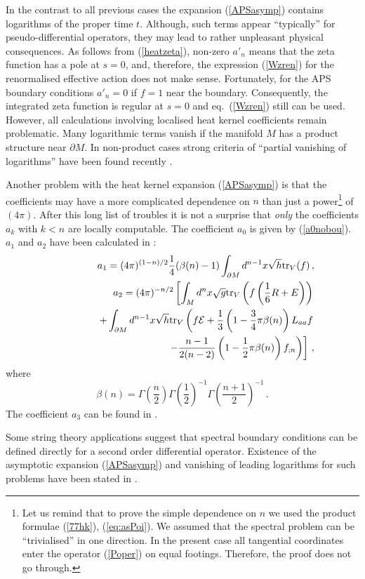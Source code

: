 In the contrast to all previous cases the expansion (\ref{APSasymp}) contains
logarithms of the proper time $t$. Although, such terms appear ``typically''
\cite{GG98} for pseudo-differential operators, they may lead to rather
unpleasant physical consequences. As follows from (\ref{heatzeta}),
non-zero $a'_n$ means that the zeta function has a pole at $s=0$, and,
therefore, the expression (\ref{Wzren}) for the renormalised
effective action does not make sense. Fortunately, for the APS
boundary conditions $a'_n=0$ if $f=1$ near the boundary. 
Consequently, the integrated
zeta function is regular at $s=0$ and eq.\ (\ref{Wzren}) still can be
used. However, all calculations involving localised heat kernel
coefficients remain problematic. Many logarithmic terms vanish if
the manifold $M$ has a product structure near $\partial M$.
In non-product cases strong criteria of ``partial vanishing of
logarithms'' have been found recently \cite{Grubb:2003ys}.

Another problem with the heat kernel expansion (\ref{APSasymp})
is that the coefficients may have a more complicated dependence
on $n$ than just a power\footnote{Let us remind that
to prove the simple dependence on $n$ we used the product
formulae (\ref{77hk}), (\ref{eq:asPoi}). We assumed that the
spectral problem can be ``trivialised'' in one direction.
In the present case all tangential coordinates enter the operator
(\ref{Poper}) on equal footings. Therefore, the proof does not go through.}
 of $(4\pi )$. After this long list of troubles it is not a surprise
that {\it only} the coefficients $a_k$ with $k<n$ are locally
computable.
The coefficient $a_0$ is given by (\ref{a0nobou}).
$a_1$ and  $a_2$ have been calculated in \cite{Dowker:2000sy}:
\begin{eqnarray}
&&a_1=(4\pi )^{(1-n)/2} \frac 14 (\beta (n)-1) \int_{\partial M} d^{n-1}x\sqrt{h} {\rm tr}_V (f)\,,
\nonumber\\
&&a_2=(4\pi )^{-n/2}\left[ \int_M d^nx\sqrt{g} {\rm tr}_V \left( f\left(\frac 16 R+E\right) \right)
\right.\nonumber\\
&&\qquad\qquad +\int_{\partial M} d^{n-1}x\sqrt{h} {\rm tr}_V \left( f \mathcal{E} +\frac 13 \left( 1-\frac 34 
\pi \beta (n) \right)L_{aa}f \right. \label{hkAPS} \\
&&\qquad\qquad \left.\left. -\frac{n-1}{2(n-2)} \left( 1-\frac 12 \pi
\beta (n)\right) f_{;n} \right) \right] \,,\nonumber
\end{eqnarray}
where
\begin{equation}
\beta (n)=\Gamma \left (\frac n2 \right) \Gamma \left( \frac 12 \right)^{-1}
\Gamma \left( \frac{n+1}2 \right)^{-1} \,.\label{betaAPS}
\end{equation}
The coefficient  $a_3$ can be found in \cite{Gilkey:2000bc}.

Some string theory applications suggest 
\cite{Vassilevich:2001at,Vassilevich:2001wf} that spectral boundary conditions
can be defined directly for a second order differential operator.
Existence of the asymptotic expansion (\ref{APSasymp}) and vanishing of
leading logarithms for such problems have been stated in
\cite{Grubb:2003yr}.